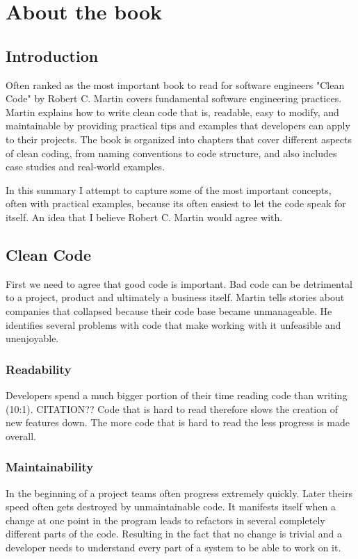 \section{About the book}

\subsection{Introduction}

Often ranked as the most important book to read for software engineers "Clean Code" by Robert C. Martin covers fundamental software engineering practices. Martin explains how to write clean code that is, readable, easy to modify, and maintainable by providing practical tips and examples that developers can apply to their projects. The book is organized into chapters that cover different aspects of clean coding, from naming conventions to code structure, and also includes case studies and real-world examples.

In this summary I attempt to capture some of the most important concepts, often with practical examples, because its often easiest to let the code speak for itself. An idea that I believe Robert C. Martin would agree with.

\subsection{Clean Code}
First we need to agree that good code is important. Bad code can be detrimental to a project, product and ultimately a business itself. Martin tells stories about companies that collapsed because their code base became unmanageable. He identifies several problems with code that make working with it unfeasible and unenjoyable.

\subsubsection{Readability}
Developers spend a much bigger portion of their time reading code than writing (10:1). CITATION?? Code that is hard to read therefore slows the creation of new features down. The more code that is hard to read the less progress is made overall.

\subsubsection{Maintainability}
In the beginning of a project teams often progress extremely quickly. Later theirs speed often gets destroyed by unmaintainable code. It manifests itself when a change at one point in the program leads to refactors in several completely different parts of the code. Resulting in the fact that no change is trivial and a developer needs to understand every part of a system to be able to work on it.

